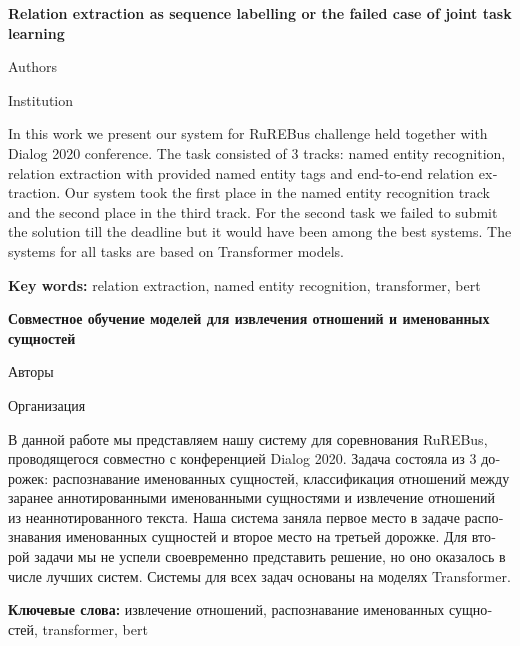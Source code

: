 \documentclass{dialogue}
\begin{document}
\begin{otherlanguage}{english}
\begin{center}
{\Large\bfseries{Relation extraction as sequence labelling or the failed case of joint task learning}}

\medskip

Authors

\medskip

Institution
\end{center}

In this work we present our system for RuREBus challenge held together with Dialog 2020 conference. The task consisted of 3 tracks: named entity recognition, relation extraction with provided named entity tags and end-to-end relation extraction. Our system took the first place in the named entity recognition track and the second place in the third track. For the second task we failed to submit the solution till the deadline but it would have been among the best systems. The systems for all tasks are based on Transformer models.

\textbf{Key words:} relation extraction, named entity recognition, transformer, bert
\end{otherlanguage}

\bigskip

\begin{otherlanguage}{russian}
\begin{center}
{\Large\bfseries{Совместное обучение моделей для извлечения отношений и именованных сущностей}}

\medskip

Авторы

\medskip

Организация
\end{center}

В данной работе мы представляем нашу систему для соревнования RuREBus, проводящегося совместно с конференцией Dialog 2020. Задача состояла из 3 дорожек: распознавание именованных сущностей, классификация отношений между заранее аннотированными именованными сущностями и извлечение отношений из неаннотированного текста. Наша система заняла первое место в задаче распознавания именованных сущностей и второе место на третьей дорожке. Для второй задачи мы не успели своевременно представить решение, но оно оказалось в числе лучших систем. Системы для всех задач основаны на моделях Transformer.
\medskip

\textbf{Ключевые слова:} извлечение отношений, распознавание именованных сущностей, transformer, bert
\end{otherlanguage}
\end{document}
